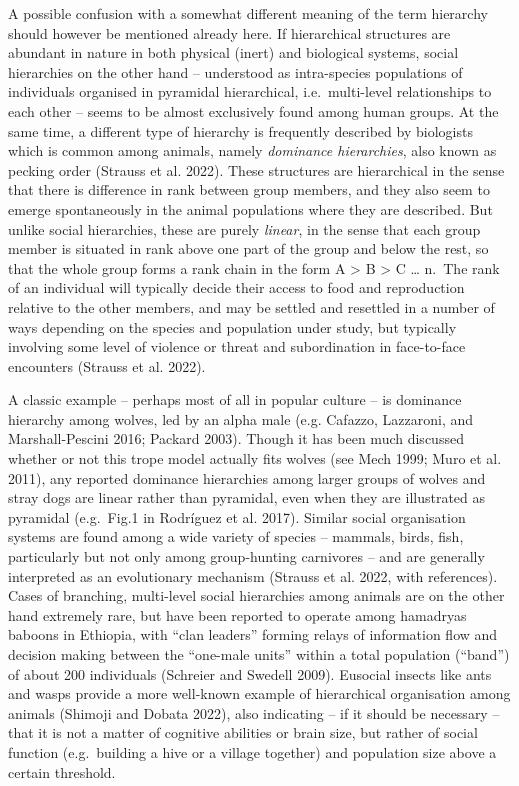 \documentclass[
  12pt,
  a4paper, twoside]{book}
\begin{document}
A possible confusion with a somewhat different meaning of the term hierarchy should however be mentioned already here. If hierarchical structures are abundant in nature in both physical (inert) and biological systems, social hierarchies on the other hand -- understood as intra-species populations of individuals organised in pyramidal hierarchical, i.e.~multi-level relationships to each other -- seems to be almost exclusively found among human groups. At the same time, a different type of hierarchy is frequently described by biologists which is common among animals, namely \emph{dominance hierarchies}, also known as pecking order (Strauss et al. 2022). These structures are hierarchical in the sense that there is difference in rank between group members, and they also seem to emerge spontaneously in the animal populations where they are described. But unlike social hierarchies, these are purely \emph{linear}, in the sense that each group member is situated in rank above one part of the group and below the rest, so that the whole group forms a rank chain in the form A \textgreater{} B \textgreater{} C \ldots{} n.~The rank of an individual will typically decide their access to food and reproduction relative to the other members, and may be settled and resettled in a number of ways depending on the species and population under study, but typically involving some level of violence or threat and subordination in face-to-face encounters (Strauss et al. 2022).

A classic example -- perhaps most of all in popular culture -- is dominance hierarchy among wolves, led by an alpha male (e.g. Cafazzo, Lazzaroni, and Marshall-Pescini 2016; Packard 2003). Though it has been much discussed whether or not this trope model actually fits wolves (see Mech 1999; Muro et al. 2011), any reported dominance hierarchies among larger groups of wolves and stray dogs are linear rather than pyramidal, even when they are illustrated as pyramidal (e.g.~Fig.1 in Rodríguez et al. 2017). Similar social organisation systems are found among a wide variety of species -- mammals, birds, fish, particularly but not only among group-hunting carnivores -- and are generally interpreted as an evolutionary mechanism (Strauss et al. 2022, with references). Cases of branching, multi-level social hierarchies among animals are on the other hand extremely rare, but have been reported to operate among hamadryas baboons in Ethiopia, with ``clan leaders'' forming relays of information flow and decision making between the ``one-male units'' within a total population (``band'') of about 200 individuals (Schreier and Swedell 2009). Eusocial insects like ants and wasps provide a more well-known example of hierarchical organisation among animals (Shimoji and Dobata 2022), also indicating -- if it should be necessary -- that it is not a matter of cognitive abilities or brain size, but rather of social function (e.g.~building a hive or a village together) and population size above a certain threshold.
\end{document}
